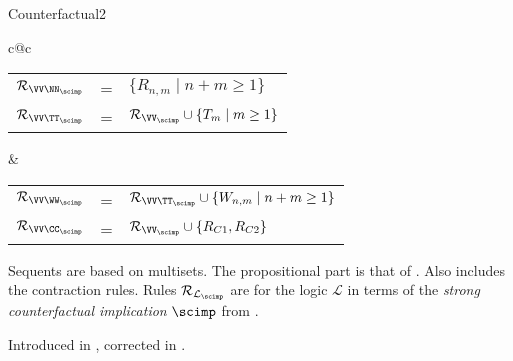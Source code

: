 \begin{entry}{Counterfactual2}
\begin{calculus}
\begin{center}
\begin{tabular}{c@{\qquad}c}
\\
\begin{tabular}{lll}
$\Rules_{\VV\NN_\scimp}$ & = & $\{ R_{n,m} \mid n+m \geq 1\}$\\
$\Rules_{\VV\TT_\scimp}$ & = & $\Rules_{\VV_\scimp} \cup \{ T_m \mid m
\geq 1\}$\\
\end{tabular}
&
\begin{tabular}{lll}
$\Rules_{\VV\WW_\scimp}$ & = &$\Rules_{\VV\TT_\scimp}\cup
\{W_{n,m}\mid n+m \geq 1\}$\\
$\Rules_{\VV\CC_\scimp}$ & = &
$\Rules_{\VV_\scimp}\cup\{R_{C1},R_{C2}\}$\\
\end{tabular}
\end{tabular}
\end{center}


\end{calculus}

\begin{clarifications}
  Sequents are based on multisets.  The propositional part is that of
  \Gtc {}. Also includes the contraction rules. Rules
  $\Rules_{\mathcal{L}_\scimp}$ are for the logic $\mathcal{L}$ in
  terms of the \emph{strong counterfactual implication} $\scimp$ from
  \cite{Lewis:1973uq}.
\end{clarifications}

\begin{history}
  Introduced in \cite{Lellmann:2012fk}, corrected in
  \cite{Lellmann:2013}.
\end{history}


\end{entry}
